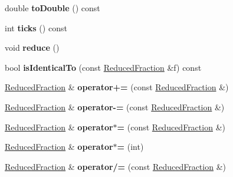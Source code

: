 \begin{DoxyCompactItemize}
double {\bfseries to\+Double} () const
\item 
\mbox{\label{class_ms_1_1_reduced_fraction_a580d3163bd2491d2030d3f29316fe5d0}} 
int {\bfseries ticks} () const
\item 
\mbox{\label{class_ms_1_1_reduced_fraction_a919abb97af8c749a24911843f6989c5a}} 
void {\bfseries reduce} ()
\item 
\mbox{\label{class_ms_1_1_reduced_fraction_ae6bc04f0136cb75446f6256d829b2f3d}} 
bool {\bfseries is\+Identical\+To} (const \hyperlink{class_ms_1_1_reduced_fraction}{Reduced\+Fraction} \&f) const
\item 
\mbox{\label{class_ms_1_1_reduced_fraction_a3aa7553006dcd7c28de12fc4be24af4d}} 
\hyperlink{class_ms_1_1_reduced_fraction}{Reduced\+Fraction} \& {\bfseries operator+=} (const \hyperlink{class_ms_1_1_reduced_fraction}{Reduced\+Fraction} \&)
\item 
\mbox{\label{class_ms_1_1_reduced_fraction_aaa127b80b1aedc62c2e1bcb4d219bbaa}} 
\hyperlink{class_ms_1_1_reduced_fraction}{Reduced\+Fraction} \& {\bfseries operator-\/=} (const \hyperlink{class_ms_1_1_reduced_fraction}{Reduced\+Fraction} \&)
\item 
\mbox{\label{class_ms_1_1_reduced_fraction_a91f6193f640190dc53e229f024026506}} 
\hyperlink{class_ms_1_1_reduced_fraction}{Reduced\+Fraction} \& {\bfseries operator$\ast$=} (const \hyperlink{class_ms_1_1_reduced_fraction}{Reduced\+Fraction} \&)
\item 
\mbox{\label{class_ms_1_1_reduced_fraction_a94ee9394f4113a3af4e0bab5eaeb3884}} 
\hyperlink{class_ms_1_1_reduced_fraction}{Reduced\+Fraction} \& {\bfseries operator$\ast$=} (int)
\item 
\mbox{\label{class_ms_1_1_reduced_fraction_a274943b26f71ba5f8d2486e734abb1c8}} 
\hyperlink{class_ms_1_1_reduced_fraction}{Reduced\+Fraction} \& {\bfseries operator/=} (const \hyperlink{class_ms_1_1_reduced_fraction}{Reduced\+Fraction} \&)
\item 

\end{DoxyCompactItemize}
